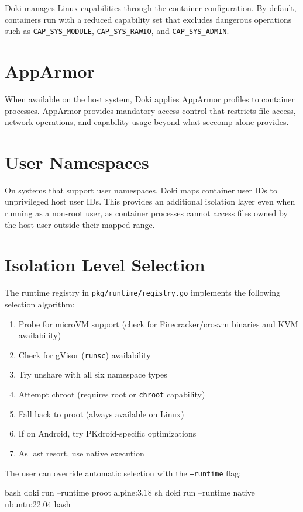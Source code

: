 Doki manages Linux capabilities through the container configuration.
By default, containers run with a reduced capability set that excludes
dangerous operations such as \texttt{CAP\_SYS\_MODULE},
\texttt{CAP\_SYS\_RAWIO}, and \texttt{CAP\_SYS\_ADMIN}.

\section{AppArmor}
\label{sec:apparmor}

When available on the host system, Doki applies AppArmor profiles to
container processes. AppArmor provides mandatory access control that
restricts file access, network operations, and capability usage beyond
what seccomp alone provides.

\section{User Namespaces}
\label{sec:user-namespaces}

On systems that support user namespaces, Doki maps container user IDs
to unprivileged host user IDs. This provides an additional isolation
layer even when running as a non-root user, as container processes
cannot access files owned by the host user outside their mapped range.

\section{Isolation Level Selection}
\label{sec:level-selection}

The runtime registry in \texttt{pkg/runtime/registry.go} implements
the following selection algorithm:

\begin{enumerate}[leftmargin=*, itemsep=3pt]
  \item Probe for microVM support (check for Firecracker/crosvm
        binaries and KVM availability)
  \item Check for gVisor (\texttt{runsc}) availability
  \item Try unshare with all six namespace types
  \item Attempt chroot (requires root or \texttt{chroot} capability)
  \item Fall back to proot (always available on Linux)
  \item If on Android, try PKdroid-specific optimizations
  \item As last resort, use native execution
\end{enumerate}

The user can override automatic selection with the
\texttt{--runtime} flag:

\begin{codebox}[title={Forcing a specific runtime}]{bash}
doki run --runtime proot alpine:3.18 sh
doki run --runtime native ubuntu:22.04 bash
\end{codebox}
